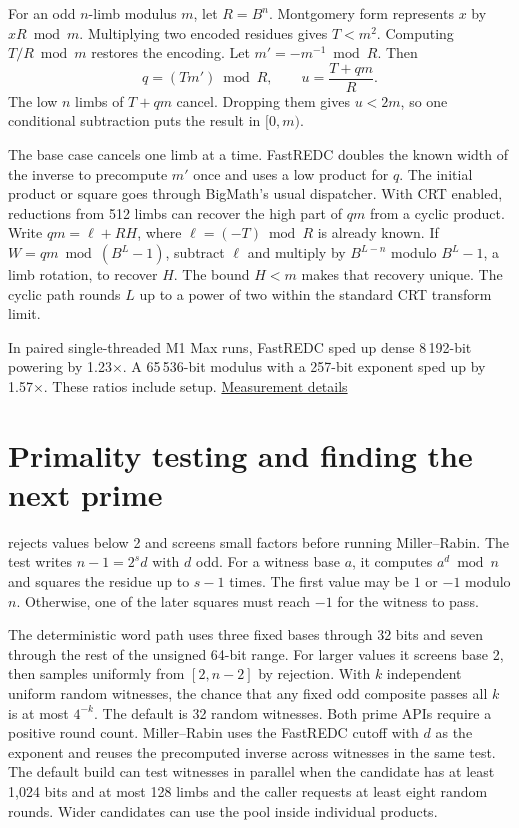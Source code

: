 For an odd $n$-limb modulus $m$, let $R=B^n$. Montgomery form represents
$x$ by $xR\bmod m$. Multiplying two encoded residues gives $T<m^2$.
Computing $T/R\bmod m$ restores the encoding. Let $m'=-m^{-1}\bmod R$.
Then
\[
q=(T m')\bmod R, \qquad u=\frac{T+qm}{R}.
\]
The low $n$ limbs of $T+qm$ cancel. Dropping them gives $u<2m$, so one
conditional subtraction puts the result in $[0,m)$.

The base case cancels one limb at a time. FastREDC doubles the known
width of the inverse to precompute $m'$ once and uses a low product for
$q$. The initial product or square goes through BigMath's usual
dispatcher. With CRT enabled, reductions from 512 limbs can recover
the high part of $qm$ from a cyclic product. Write $qm=\ell+RH$, where
$\ell=(-T)\bmod R$ is already known. If $W=qm\bmod(B^L-1)$, subtract
$\ell$ and multiply by $B^{L-n}$ modulo $B^L-1$, a limb rotation, to recover $H$.
The bound $H<m$ makes that recovery unique. The cyclic path rounds $L$
up to a power of two within the standard CRT transform limit.

\begin{perfnote}
In paired single-threaded M1 Max runs, FastREDC sped up dense
8\,192-bit powering by 1.23$\times$. A 65\,536-bit modulus with a
257-bit exponent sped up by 1.57$\times$. These ratios include setup.
\href{https://github.com/mmurshed/biginteger/blob/main/BENCHMARK.md\#subquadratic-montgomery-reduction}{Measurement details}
\end{perfnote}

\newpage
\section{Primality testing and finding the next prime}
\label{sec:prime}

 rejects values below 2 and screens small
factors before running Miller--Rabin. The test writes $n-1=2^s d$ with $d$
odd. For a witness base $a$, it computes $a^d\bmod n$ and squares the residue
up to $s-1$ times. The first value may be $1$ or $-1$ modulo $n$. Otherwise,
one of the later squares must reach $-1$ for the witness to pass.

The deterministic word path uses three fixed bases through 32 bits and
seven through the rest of the unsigned 64-bit range. For larger values it
screens base 2, then samples uniformly from $[2,n-2]$ by rejection.
With $k$ independent uniform random witnesses, the chance that any
fixed odd composite passes all $k$ is at most $4^{-k}$. The default is
32 random witnesses. Both prime APIs require a positive round count.
Miller--Rabin uses the FastREDC cutoff with $d$ as the exponent and
reuses the precomputed inverse across witnesses in the same test.
The default build can test witnesses in parallel when the candidate
has at least 1,024 bits and at most 128 limbs and the caller requests
at least eight random rounds. Wider candidates can use the pool inside
individual products.

